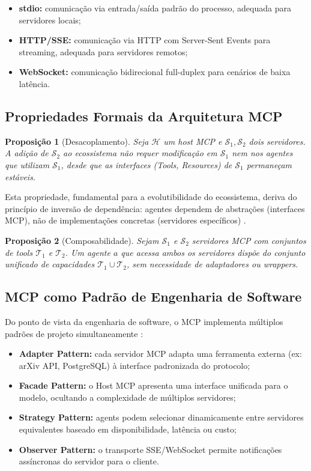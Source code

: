 \documentclass[12pt,a4paper,sumario=tradicional]{abntex2}
\newtheorem{proposition}{Proposição}[chapter]
\begin{document}
\begin{itemize}
    \item \textbf{stdio:} comunicação via entrada/saída padrão do processo, adequada para servidores locais;
    \item \textbf{HTTP/SSE:} comunicação via HTTP com Server-Sent Events para streaming, adequada para servidores remotos;
    \item \textbf{WebSocket:} comunicação bidirecional full-duplex para cenários de baixa latência.
\end{itemize}

\subsection{Propriedades Formais da Arquitetura MCP}

\begin{proposition}[Desacoplamento]
Seja $\mathcal{H}$ um host MCP e $\mathcal{S}_1, \mathcal{S}_2$ dois servidores. A adição de $\mathcal{S}_2$ ao ecossistema não requer modificação em $\mathcal{S}_1$ nem nos agentes que utilizam $\mathcal{S}_1$, desde que as interfaces (Tools, Resources) de $\mathcal{S}_1$ permaneçam estáveis.
\end{proposition}

Esta propriedade, fundamental para a evolutibilidade do ecossistema, deriva do princípio de inversão de dependência: agentes dependem de abstrações (interfaces MCP), não de implementações concretas (servidores específicos) \cite{babar2009supporting}.

\begin{proposition}[Composabilidade]
Sejam $\mathcal{S}_1$ e $\mathcal{S}_2$ servidores MCP com conjuntos de tools $\mathcal{T}_1$ e $\mathcal{T}_2$. Um agente $a$ que acessa ambos os servidores dispõe do conjunto unificado de capacidades $\mathcal{T}_1 \cup \mathcal{T}_2$, sem necessidade de adaptadores ou wrappers.
\end{proposition}

\subsection{MCP como Padrão de Engenharia de Software}

Do ponto de vista da engenharia de software, o MCP implementa múltiplos padrões de projeto simultaneamente \cite{dingsøyr2009introduction}:

\begin{itemize}
    \item \textbf{Adapter Pattern:} cada servidor MCP adapta uma ferramenta externa (ex: arXiv API, PostgreSQL) à interface padronizada do protocolo;
    \item \textbf{Facade Pattern:} o Host MCP apresenta uma interface unificada para o modelo, ocultando a complexidade de múltiplos servidores;
    \item \textbf{Strategy Pattern:} agents podem selecionar dinamicamente entre servidores equivalentes baseado em disponibilidade, latência ou custo;
    \item \textbf{Observer Pattern:} o transporte SSE/WebSocket permite notificações assíncronas do servidor para o cliente.
\end{itemize}
\end{document}
